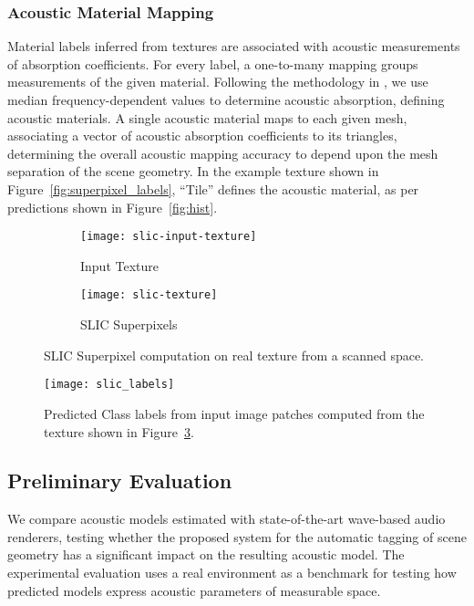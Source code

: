 \subsubsection{Acoustic Material Mapping}
Material labels inferred from textures are associated with acoustic measurements of absorption coefficients. For every label, a one-to-many mapping groups measurements of the given material. Following the methodology in \cite{kim2020acoustic}, we use median frequency-dependent values to determine acoustic absorption, defining acoustic materials. A single acoustic material maps to each given mesh, associating a vector of acoustic absorption coefficients to its triangles, determining the overall acoustic mapping accuracy to depend upon the mesh separation of the scene geometry. In the example texture shown in Figure~\ref{fig:superpixel_labels}, ``Tile'' defines the acoustic material, as per predictions shown in Figure~\ref{fig:hist}.
\begin{figure}
    \centering
    \begin{subfigure}[t]{0.49\textwidth}
       \centering
       \texttt{[image: slic-input-texture]}
       \caption{Input Texture}
       \label{fig:slic-input-texture}
    \end{subfigure}
    \begin{subfigure}[t]{0.49\textwidth}
       \centering
       \texttt{[image: slic-texture]}
       \caption{SLIC Superpixels}
       \label{fig:slic-labels}
    \end{subfigure}
\caption{SLIC Superpixel computation on real texture from a scanned space.}
\label{fig:slic-generation}
\end{figure}

\begin{figure}[htbp]
    \centering
    \texttt{[image: slic\_labels]}
    \caption{Predicted Class labels from input image patches computed from the texture shown in Figure~\ref{fig:slic-generation}.}
    \label{fig:slic-labels}
\end{figure}


\subsection{Preliminary Evaluation}
We compare acoustic models estimated with state-of-the-art wave-based audio renderers, testing whether the proposed system for the automatic tagging of scene geometry has a significant impact on the resulting acoustic model. The experimental evaluation uses a real environment as a benchmark for testing how predicted models express acoustic parameters of measurable space.


